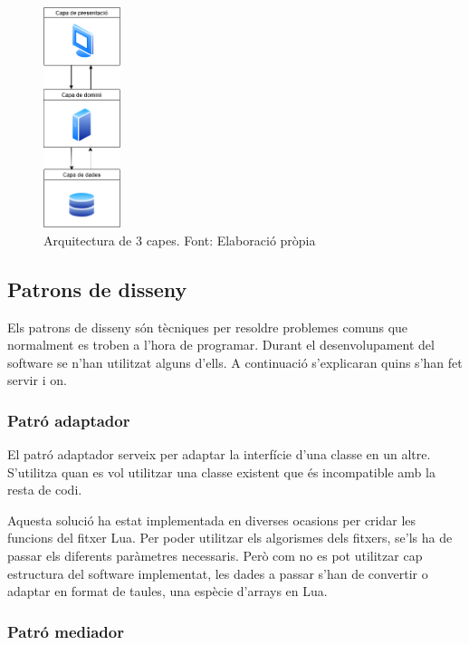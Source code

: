 \documentclass[a4paper]{article}
\begin{document}
\begin{figure}[H]
    \centering
    \includegraphics[width=0.2\textwidth]{images/3-capes.png}
    \caption{Arquitectura de 3 capes. Font: Elaboració pròpia}
    \label{fig:ArchitectureCapes}
\end{figure}

\subsection{Patrons de disseny}

Els patrons de disseny són tècniques per resoldre problemes comuns que normalment es troben a l'hora de programar. Durant el desenvolupament del software se n'han utilitzat alguns d'ells. A continuació s'explicaran quins s'han fet servir i on.

\subsubsection*{Patró adaptador}
El patró adaptador serveix per adaptar la interfície d'una classe en un altre. S'utilitza quan es vol utilitzar una classe existent que és incompatible amb la resta de codi.

Aquesta solució ha estat implementada en diverses ocasions per cridar les funcions del fitxer Lua. Per poder utilitzar els algorismes dels fitxers, se'ls ha de passar els diferents paràmetres necessaris. Però com no es pot utilitzar cap estructura del software implementat, les dades a passar s'han de convertir o adaptar en format de taules, una espècie d'arrays en Lua.

\subsubsection*{Patró mediador}
\end{document}
